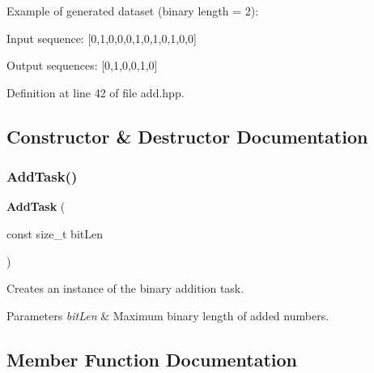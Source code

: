 Example of generated dataset (binary length = 2)\+:
\begin{DoxyItemize}
\item Input sequence\+: [0,1,0,0,0,1,0,1,0,1,0,0]
\item Output sequences\+: [0,1,0,0,1,0] 
\end{DoxyItemize}

Definition at line 42 of file add.\+hpp.



\subsection{Constructor \& Destructor Documentation}
\mbox{\label{classmlpack_1_1ann_1_1augmented_1_1tasks_1_1AddTask_a10777342b89a4cf899e781818398985c}} 
\subsubsection{Add\+Task()}
{\footnotesize\ttfamily \textbf{ Add\+Task} (\begin{DoxyParamCaption}\item[{const size\+\_\+t}]{bit\+Len }\end{DoxyParamCaption})}



Creates an instance of the binary addition task. 


\begin{DoxyParams}{Parameters}
{\em bit\+Len} & Maximum binary length of added numbers. \\
\hline
\end{DoxyParams}


\subsection{Member Function Documentation}
\mbox{\label{classmlpack_1_1ann_1_1augmented_1_1tasks_1_1AddTask_ac51ef451121f38083af41f02236f03af}} 
